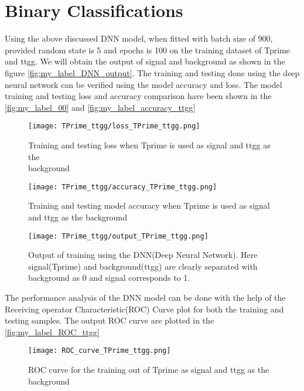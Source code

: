  \section{Binary Classifications}
 
Using the above discussed DNN model, when fitted with batch size of 900, provided random state is 5 and epochs is 100 on the training dataset of Tprime and ttgg. We will obtain the output of signal and background as shown in the figure \autoref{fig:my_label_DNN_output}. The training and testing done using the deep neural network can be verified using the model accuracy and loss. The model training and testing loss and accuracy comparison have been shown in the \autoref{fig:my_label_00}  and  \autoref{fig:my_label_accuracy_ttgg} \\
 
   
\begin{figure}[H]
    \centering
    \texttt{[image: TPrime\_ttgg/loss\_TPrime\_ttgg.png]}
    \caption{Training and testing loss when Tprime is used as signal and ttgg as the \\background}    \label{fig:my_label_00}
\end{figure}
\begin{figure}[H]
    \centering
    \texttt{[image: TPrime\_ttgg/accuracy\_TPrime\_ttgg.png]}
    \caption{Training and testing model accuracy when Tprime is used as signal and ttgg as the background}
    \label{fig:my_label_accuracy_ttgg}
\end{figure}

 \begin{figure}[H]
     \centering
     \texttt{[image: TPrime\_ttgg/output\_TPrime\_ttgg.png]}
     \caption{Output of training using the DNN(Deep Neural Network). Here signal(Tprime) and background(ttgg) are clearly separated with background as 0 and signal corresponds to 1. }
     \label{fig:my_label_DNN_output}
 \end{figure}
 
 The performance analysis of the DNN model can be done with the help of the Receiving operator Characteristic(ROC) Curve plot for both the training and testing samples. The output ROC curve are plotted in the \autoref{fig:my_label_ROC_ttgg}
\begin{figure}[H]
    \centering
    \texttt{[image: ROC\_curve\_TPrime\_ttgg.png]}
    \caption{ROC curve for the training out of Tprime as signal and ttgg as the background}
    \label{fig:my_label_ROC_ttgg}
\end{figure}

